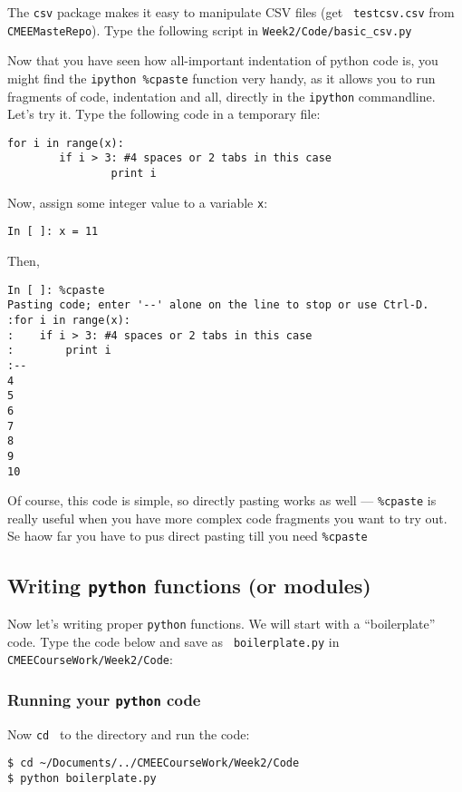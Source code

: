 The {\tt csv} package makes it easy to manipulate CSV files (get {\tt 
testcsv.csv} from {\tt CMEEMasteRepo}). Type the following script in 
{\tt Week2/Code/basic\_csv.py}
  


\begin{tipbox}
Now that you have seen how all-important indentation of python code is, 
you might find the {\tt ipython \%cpaste} function very handy, as it 
allows you to run fragments of code, indentation and all, directly in 
the {\tt ipython} commandline. Let's try it. Type the following code 
in a temporary file:
\begin{lstlisting}
for i in range(x):
		if i > 3: #4 spaces or 2 tabs in this case
				print i 
\end{lstlisting}
Now, assign some integer value to a variable {\tt x}: 
\begin{lstlisting}
In [ ]: x = 11
\end{lstlisting}
Then,
\begin{lstlisting}
In [ ]: %cpaste
Pasting code; enter '--' alone on the line to stop or use Ctrl-D.
:for i in range(x):
:    if i > 3: #4 spaces or 2 tabs in this case
:        print i
:--
4
5
6
7
8
9
10
\end{lstlisting}
Of course, this code is simple, so directly pasting works as well --- 
{\tt \%cpaste} is really useful when you have more complex code fragments 
you want to try out. Se haow far you have to pus direct pasting till 
you need {\tt \%cpaste}
\end{tipbox}

\subsection{Writing {\tt python} functions (or modules)}

Now let's writing proper {\tt python} functions. We will start with a 
``boilerplate'' code. Type the code below and save as {\tt 
boilerplate.py} in {\tt CMEECourseWork/Week2/Code}:



\subsubsection{Running your {\tt python} code}

Now {\tt cd } to the directory and run the code:
\begin{lstlisting}
$ cd ~/Documents/../CMEECourseWork/Week2/Code
$ python boilerplate.py
\end{lstlisting}

